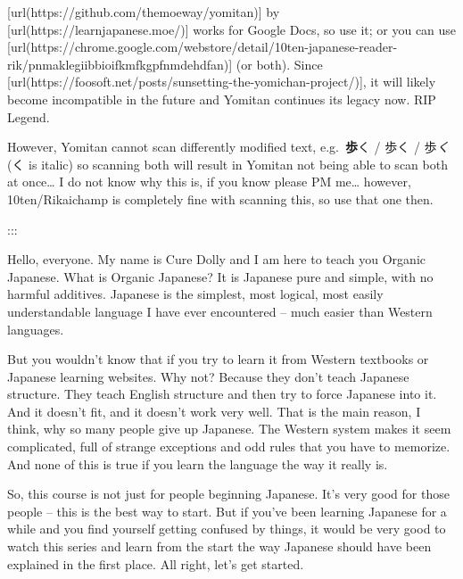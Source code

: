 [url(https://github.com/themoeway/yomitan)] by [url(https://learnjapanese.moe/)] works for Google Docs, so use it; or you can use [url(https://chrome.google.com/webstore/detail/10ten-japanese-reader-rik/pnmaklegiibbioifkmfkgpfnmdehdfan)] (or both). Since [url(https://foosoft.net/posts/sunsetting-the-yomichan-project/)], it will likely become incompatible in the future and Yomitan continues its legacy now. RIP Legend.

However, Yomitan cannot scan differently modified text, e.g.~{\bf 歩}く / 歩く / 歩{\em く} (く is italic) so scanning both will result in Yomitan not being able to scan both at once\ldots{} I do not know why this is, if you know please PM me\ldots{} however, 10ten/Rikaichamp is completely fine with scanning this, so use that one then.

:::

\stopsectionlevel

\startsectionlevel[title={In Memory of Cure Dolly},reference={in-memory-of-cure-dolly}]

Hello, everyone. My name is Cure Dolly and I am here to teach you Organic Japanese. What is Organic Japanese? It is Japanese pure and simple, with no harmful additives. Japanese is the simplest, most logical, most easily understandable language I have ever encountered -- much easier than Western languages.

But you wouldn't know that if you try to learn it from Western textbooks or Japanese learning websites. Why not? Because they don't teach Japanese structure. They teach English structure and then try to force Japanese into it. And it doesn't fit, and it doesn't work very well. That is the main reason, I think, why so many people give up Japanese. The Western system makes it seem complicated, full of strange exceptions and odd rules that you have to memorize. And none of this is true if you learn the language the way it really is.

So, this course is not just for people beginning Japanese. It's very good for those people -- this is the best way to start. But if you've been learning Japanese for a while and you find yourself getting confused by things, it would be very good to watch this series and learn from the start the way Japanese should have been explained in the first place. All right, let's get started.

\stopsectionlevel

\stopsectionlevel
